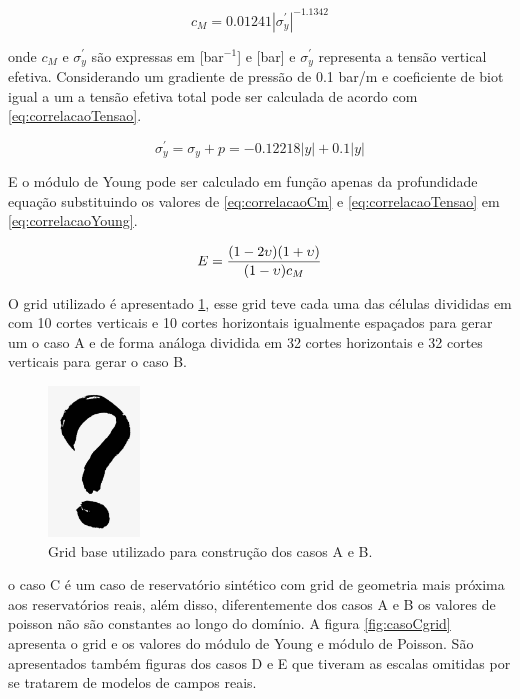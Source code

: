 \begin{equation} \label{eq:correlacaoCm}
    c_M = 0.01241 |\sigma_y^\prime|^{-1.1342}
\end{equation}

onde $c_M$ e $\sigma_y^\prime$ são expressas em [bar$^{-1}$] e [bar] e  $\sigma_y^\prime$ representa a tensão vertical efetiva.
Considerando um gradiente de pressão de 0.1 bar/m e coeficiente de biot igual a um a tensão efetiva total pode ser calculada de acordo com \ref{eq:correlacaoTensao}.




\begin{equation} \label{eq:correlacaoTensao}
\sigma_y^\prime = \sigma_y + p = -0.12218|y| + 0.1 |y|
\end{equation}

E o módulo de Young pode ser calculado em função apenas da profundidade equação substituindo os valores de \ref{eq:correlacaoCm} e \ref{eq:correlacaoTensao} em \ref{eq:correlacaoYoung}.

\begin{equation} \label{eq:correlacaoYoung}
    E = \frac{(1-2\upsilon)(1+\upsilon)}{(1-\upsilon)c_M}
\end{equation}

O grid utilizado é apresentado \ref{fig:gridBase10x10}, esse grid teve cada uma das células divididas em com 10 cortes verticais e 
10 cortes horizontais igualmente espaçados para gerar um o caso A e de forma análoga dividida em 32 cortes horizontais e 
32 cortes verticais para gerar o caso B.

\begin{figure}[!htbp]
    \centering
    \includegraphics[height=4cm]{interrogacao.png}
    \caption{Grid base utilizado para construção dos casos A e B.}
    \label{fig:gridBase10x10}
\end{figure}

o caso C é um caso de reservatório sintético com grid de geometria mais próxima aos reservatórios reais, além disso, diferentemente dos casos A e B os valores
de poisson não são constantes ao longo do domínio. A figura \ref{fig:casoCgrid} apresenta o grid e os valores do módulo de Young e módulo de Poisson.
São apresentados também figuras dos casos D e E que tiveram as escalas omitidas por se tratarem de modelos de campos reais.


